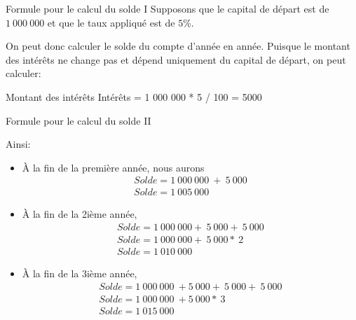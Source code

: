 \documentclass{beamer}
\begin{document}
\begin{frame}{Formule pour le calcul du solde I}
  Supposons que le capital de départ est de $1\ 000\ 000$ et que le taux appliqué est de $5$\%.
  
  On peut donc calculer le solde du compte d'année en année. Puisque le montant des intérêts ne change pas et dépend uniquement du capital de départ, on peut calculer:
  \vspace{12pt}
  \begin{block}{Montant des intérêts}
    Intérêts = 1 000 000 * 5 / 100 = 5000
  \end{block}
\end{frame}

\begin{frame}{Formule pour le calcul du solde II}
\begin{small}
  Ainsi:
  \begin{itemize}
    \item \`A la fin de la première année, nous aurons
      \[
        \begin{array}{l}
          Solde = 1\ 000\ 000\ +\ 5\ 000 \\
          Solde = 1\ 005\ 000
        \end{array}
      \]
    \item \`A la fin de la 2ième année,
      \[
        \begin{array}{l}
          Solde = 1\ 000\ 000 +\ 5\ 000 +\ 5\ 000 \\
          Solde = 1\ 000\ 000 +\ 5\ 000 *\ 2 \\
          Solde = 1\ 010\ 000
        \end{array}
      \]
    \item \`A la fin de la 3ième année,\\
      \[
        \begin{array}{l}
          Solde = 1\ 000\ 000\ + 5\ 000 +\ 5\ 000 +\ 5\ 000 \\
          Solde = 1\ 000\ 000\ + 5\ 000 *\ 3 \\
          Solde = 1\ 015\ 000
        \end{array}
      \]
  \end{itemize}
\end{small}
\end{frame}
\end{document}
